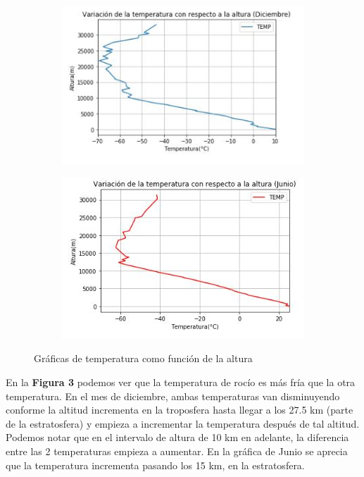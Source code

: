 \documentclass[a4paper]{article}
\begin{document}
\begin{figure}[ht!]
\centering
\begin{subfigure}{0.49\textwidth}
\centering
\includegraphics[width = \textwidth]{Temp_altura_dec.JPG}

\end{subfigure}
\begin{subfigure}{0.49\textwidth}
\centering
\includegraphics[width = \textwidth]{Temp_altura_jun.JPG}

\end{subfigure}
\caption{Gráficas de temperatura como función de la altura}
\label{fig:combined}
\end{figure}

En la \textbf{Figura 3} podemos ver que la temperatura de rocío es más fría que la otra temperatura. En el mes de diciembre, ambas temperaturas van disminuyendo conforme la altitud incrementa en la troposfera hasta llegar a los 27.5 km (parte de la estratosfera) y empieza a incrementar la temperatura después de tal altitud.  
Podemos notar que en el intervalo de altura de 10 km en adelante, la diferencia entre las 2 temperaturas empieza a aumentar. En la gráfica de Junio se aprecia que la temperatura incrementa pasando los 15 km, en la estratosfera. 
\end{document}
